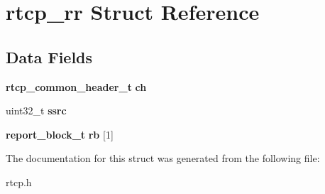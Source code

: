 \section{rtcp\+\_\+rr Struct Reference}
\label{structrtcp__rr}
\subsection*{Data Fields}
\begin{DoxyCompactItemize}
\item 
\mbox{\label{structrtcp__rr_a9d969d153214fded838a160cf7317251}} 
\textbf{ rtcp\+\_\+common\+\_\+header\+\_\+t} {\bfseries ch}
\item 
\mbox{\label{structrtcp__rr_aaee1180e3c60db1a541861165d59b9cb}} 
uint32\+\_\+t {\bfseries ssrc}
\item 
\mbox{\label{structrtcp__rr_a1ddec5fee11bb1a6b8d562c677744e08}} 
\textbf{ report\+\_\+block\+\_\+t} {\bfseries rb} [1]
\end{DoxyCompactItemize}


The documentation for this struct was generated from the following file\+:\begin{DoxyCompactItemize}
\item 
rtcp.\+h\end{DoxyCompactItemize}
